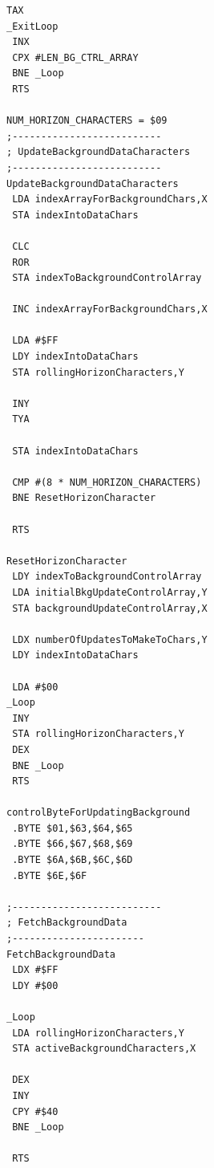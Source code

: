 \begin{minipage}[b]{0.33\linewidth}
\begin{lrbox}{\mybox}%
\begin{lstlisting}[basicstyle=\ttfamily\tiny]
 TAX 
_ExitLoop
 INX 
 CPX #LEN_BG_CTRL_ARRAY
 BNE _Loop
 RTS 

NUM_HORIZON_CHARACTERS = $09
;--------------------------
; UpdateBackgroundDataCharacters
;--------------------------
UpdateBackgroundDataCharacters   
 LDA indexArrayForBackgroundChars,X
 STA indexIntoDataChars

 CLC 
 ROR 
 STA indexToBackgroundControlArray

 INC indexArrayForBackgroundChars,X

 LDA #$FF
 LDY indexIntoDataChars
 STA rollingHorizonCharacters,Y

 INY 
 TYA 

 STA indexIntoDataChars

 CMP #(8 * NUM_HORIZON_CHARACTERS)
 BNE ResetHorizonCharacter

 RTS 

ResetHorizonCharacter   
 LDY indexToBackgroundControlArray
 LDA initialBkgUpdateControlArray,Y
 STA backgroundUpdateControlArray,X

 LDX numberOfUpdatesToMakeToChars,Y
 LDY indexIntoDataChars

 LDA #$00
_Loop
 INY 
 STA rollingHorizonCharacters,Y
 DEX 
 BNE _Loop
 RTS 

controlByteForUpdatingBackground   
 .BYTE $01,$63,$64,$65
 .BYTE $66,$67,$68,$69
 .BYTE $6A,$6B,$6C,$6D
 .BYTE $6E,$6F

;--------------------------
; FetchBackgroundData
;-----------------------
FetchBackgroundData   
 LDX #$FF
 LDY #$00

_Loop   
 LDA rollingHorizonCharacters,Y
 STA activeBackgroundCharacters,X

 DEX 
 INY 
 CPY #$40
 BNE _Loop

 RTS 
\end{lstlisting}
\end{lrbox}%
\scalebox{0.8}{\usebox{\mybox}}
\end{minipage}
